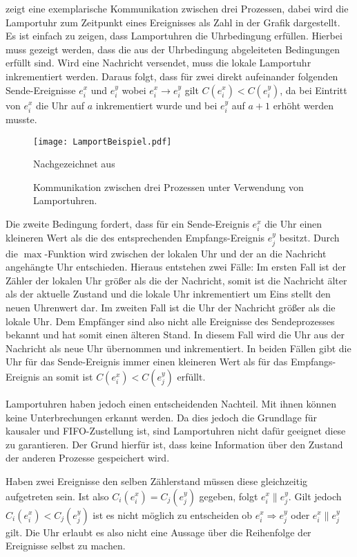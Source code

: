  zeigt eine exemplarische Kommunikation zwischen drei Prozessen, dabei wird die Lamportuhr zum Zeitpunkt eines Ereignisses als Zahl in der Grafik dargestellt.
Es ist einfach zu zeigen, dass Lamportuhren die Uhrbedingung erfüllen.
Hierbei muss gezeigt werden, dass die aus der Uhrbedingung abgeleiteten Bedingungen erfüllt sind.
Wird eine Nachricht versendet, muss die lokale Lamportuhr inkrementiert werden. 
Daraus folgt, dass für zwei direkt aufeinander folgenden Sende-Ereignisse $e_i^x$ und $e_i^y$ wobei $e_i^x \rightarrow e_i^y$ gilt $C(e_i^x) < C(e_i^y)$, da bei Eintritt von $e_i^x$ die Uhr auf $a$ inkrementiert wurde und bei $e_i^y$ auf $a + 1$ erhöht werden musste.

\begin{figure}[ht]
    \centering
    \texttt{[image: LamportBeispiel.pdf]}
    \caption[Exemplarische Kommunikation mit Lamport Uhr]{Kommunikation zwischen drei Prozessen unter Verwendung von Lamportuhren.}
    Nachgezeichnet aus  \cite{landes2006dynamic}
    \label{fig:lamportBsp}
\end{figure}

Die zweite Bedingung fordert, dass für ein Sende-Ereignis $e_i^x$ die Uhr einen kleineren Wert als die des entsprechenden Empfangs-Ereignis $e_j^y$ besitzt.
Durch die $\max$-Funktion wird zwischen der lokalen Uhr und der an die Nachricht angehängte Uhr entschieden.
Hieraus entstehen zwei Fälle:
Im ersten Fall ist der Zähler der lokalen Uhr größer als die der Nachricht, somit ist die Nachricht älter als der aktuelle Zustand und die lokale Uhr inkrementiert um Eins stellt den neuen Uhrenwert dar.
Im zweiten Fall ist die Uhr der Nachricht größer als die lokale Uhr.
Dem Empfänger sind also nicht alle Ereignisse des Sendeprozesses bekannt und hat somit einen älteren Stand.
In diesem Fall wird die Uhr aus der Nachricht als neue Uhr übernommen und inkrementiert.
In beiden Fällen gibt die Uhr für das Sende-Ereignis immer einen kleineren Wert als für das Empfangs-Ereignis an somit ist $C(e_i^x) < C(e_j^y)$ erfüllt.

Lamportuhren haben jedoch einen entscheidenden Nachteil.
Mit ihnen können keine Unterbrechungen erkannt werden.
Da dies jedoch die Grundlage für kausaler und FIFO-Zustellung ist, sind Lamportuhren nicht dafür geeignet diese zu garantieren.
Der Grund hierfür ist, dass keine Information über den Zustand der anderen Prozesse gespeichert wird.

Haben zwei Ereignisse den selben Zählerstand müssen diese gleichzeitig aufgetreten sein.
Ist also $C_i(e_i^x)=C_j(e_j^y)$ gegeben, folgt $e_i^x \parallel e_j^y$.
Gilt jedoch $C_i(e_i^x)<C_j(e_j^y)$ ist es nicht möglich zu entscheiden ob $e_i^x \Rightarrow e_j^y$ oder $e_i^x \parallel e_j^y$ gilt.
Die Uhr erlaubt es also nicht eine Aussage über die Reihenfolge der Ereignisse selbst zu machen.

